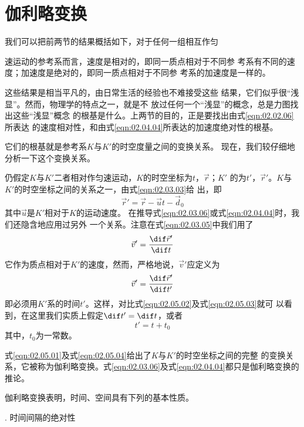 \documentclass[../outline-of-mechanics.tex]{subfiles}
\begin{document}
\section{伽利略变换}\label{sec:02.05}

我们可以把前两节的结果概括如下，对于任何一组相互作匀

\noindent 速运动的参考系而言，速度是相对的，即同一质点相对于不同参
考系有不同的速度；加速度是绝对的，即同一质点相对于不同参
考系的加速度是一样的。

这些结果是相当平凡的，由日常生活的经验也不难接受这些
结果，它们似乎很“浅显”。然而，物理学的特点之一，就是不
放过任何一个“浅显”的概念，总是力图找出这些“浅显”概念
的根基是什么。上两节的目的，正是要找出由式\eqref{eqn:02.02.06}所表达
的速度相对性，和由式\eqref{eqn:02.04.04}所表达的加速度绝对性的根基。

它们的根基就是参考系$K$与$K'$的时空度量之间的变换关系。
现在，我们较仔细地分析一下这个变换关系。

仍假定$K$与$K'$二者相对作匀速运动，$K$的时空坐标为$t$，$\vec{r}$；$K'$
的为$t'$，$\vec{r}'$。$K$与$K'$的时空坐标之间的关系之一，由式\eqref{eqn:02.03.03}给
出，即
\begin{equation}\label{eqn:02.05.01}
  \vec{r}'=\vec{r}-\vec{u} t -\vec{d}_0
\end{equation}
其中$\vec{u}$是$K'$相对于$K$的运动速度。
在推导式\eqref{eqn:02.03.06}或式\eqref{eqn:02.04.04}时，我们还隐含地应用过另外
一个关系。注意在式\eqref{eqn:02.03.05}中我们用了
\begin{equation}\label{eqn:02.05.02}
  \vec{v}'=\frac{\dif \vec{r}'}{\dif t}
\end{equation}
它作为质点相对于$K'$的速度，然而，严格地说，$\vec{v}'$应定义为
\begin{equation}\label{eqn:02.05.03}
  \vec{v}'=\frac{\dif \vec{r}'}{\dif t'}
\end{equation}
即必须用$K'$系的时间$t'$。这样，对比式\eqref{eqn:02.05.02}及式\eqref{eqn:02.05.03}就可
以看到，在这里我们实质上假定$\dif t'=\dif t$，或者
\begin{equation}\label{eqn:02.05.04}
  t'=t+t_0
\end{equation}
其中，$t_0$为一常数。

式\eqref{eqn:02.05.01}及式\eqref{eqn:02.05.04}给出了$K$与$K'$的时空坐标之间的完整
的变换关系，它被称为伽利略变换。式\eqref{eqn:02.03.06}及式\eqref{eqn:02.04.04}都只是伽利略变换的推论。

伽利略变换表明，时间、空间具有下列的基本性质。

. 时间间隔的绝对性 \normalfont
\end{document}
